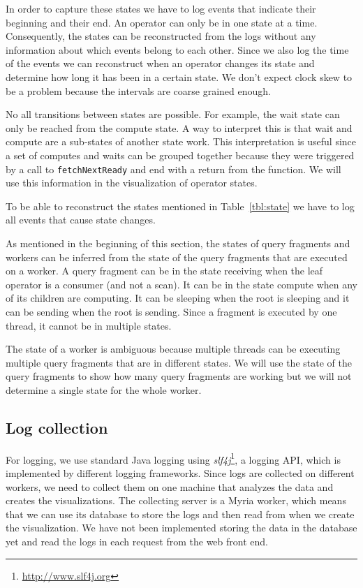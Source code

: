 \documentclass[11pt]{scrartcl}
\begin{document}
In order to capture these states we have to log events that indicate their beginning and their end. An operator can only be in one state at a time. Consequently, the states can be reconstructed from the logs without any information about which events belong to each other. Since we also log the time of the events we can reconstruct when an operator changes its state and determine how long it has been in a certain state. We don't expect clock skew to be a problem because the intervals are coarse grained enough.

No all transitions between states are possible. For example, the wait state can only be reached from the compute state. A way to interpret this is that wait and compute are a sub-states of another state work. This interpretation is useful since a set of computes and waits can be grouped together because they were triggered by a call to \texttt{fetchNextReady} and end with a return from the function. We will use this information in the visualization of operator states.

To be able to reconstruct the states mentioned in Table~\ref{tbl:state} we have to log all events that cause state changes.

As mentioned in the beginning of this section, the states of query fragments and workers can be inferred from the state of the query fragments that are executed on a worker. A query fragment can be in the state receiving when the leaf operator is a consumer (and not a scan). It can be in the state compute when any of its children are computing. It can be sleeping when the root is sleeping and it can be sending when the root is sending. Since a fragment is executed by one thread, it cannot be in multiple states.

The state of a worker is ambiguous because multiple threads can be executing multiple query fragments that are in different states. We will use the state of the query fragments to show how many query fragments are working but we will not determine a single state for the whole worker.


\subsection{Log collection}
\label{sec:collect}

For logging, we use standard Java logging using \emph{slf4j}\footnote{\url{http://www.slf4j.org}}, a logging API, which is implemented by different logging frameworks. Since logs are collected on different workers, we need to collect them on one machine that analyzes the data and creates the visualizations. The collecting server is a Myria worker, which means that we can use its database to store the logs and then read from when we create the visualization. We have not been implemented storing the data in the database yet and read the logs in each request from the web front end.
\end{document}
